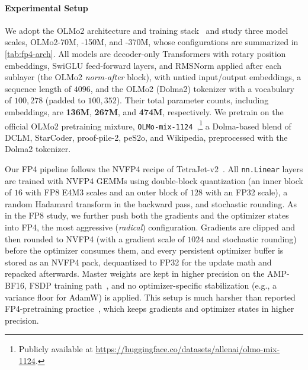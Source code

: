 \documentclass{article}
\begin{document}
\paragraph{Experimental Setup}
We adopt the OLMo2 architecture and training stack~\citep{olmo2024olmo2} and study three model scales, OLMo2-70M, -150M, and -370M, whose configurations are summarized in \cref{tab:fp4-arch}. All models are decoder-only Transformers with rotary position embeddings, SwiGLU feed-forward layers, and RMSNorm applied after each sublayer (the OLMo2 \emph{norm-after} block), with untied input/output embeddings, a sequence length of $4096$, and the OLMo2 (Dolma2) tokenizer with a vocabulary of $100{,}278$ (padded to $100{,}352$). Their total parameter counts, including embeddings, are \textbf{136M}, \textbf{267M}, and \textbf{474M}, respectively. We pretrain on the official OLMo2 pretraining mixture, \texttt{OLMo-mix-1124}~\citep{olmo2024olmo2},\footnote{Publicly available at \url{https://huggingface.co/datasets/allenai/olmo-mix-1124}.} a Dolma-based blend of DCLM, StarCoder, proof-pile-2, peS2o, and Wikipedia, preprocessed with the Dolma2 tokenizer.

Our FP4 pipeline follows the NVFP4 recipe of TetraJet-v2~\citep{chen2026tetrajetv2}. All \texttt{nn.Linear} layers are trained with NVFP4 GEMMs using double-block quantization (an inner block of $16$ with FP8 E4M3 scales and an outer block of $128$ with an FP32 scale), a random Hadamard transform in the backward pass, and stochastic rounding. As in the FP8 study, we further push both the gradients and the optimizer states into FP4, the most aggressive (\emph{radical}) configuration. Gradients are clipped and then rounded to NVFP4 (with a gradient scale of $1024$ and stochastic rounding) before the optimizer consumes them, and every persistent optimizer buffer is stored as an NVFP4 pack, dequantized to FP32 for the update math and repacked afterwards. Master weights are kept in higher precision on the AMP-BF16, FSDP training path~\citep{micikevicius2018mixed}, and no optimizer-specific stabilization (e.g., a variance floor for AdamW) is applied. This setup is much harsher than reported FP4-pretraining practice~\citep{castro2025quartet_fp4,abecassis2025pretraining_fp4}, which keeps gradients and optimizer states in higher precision.
\end{document}
